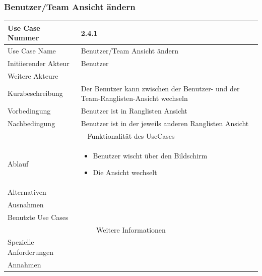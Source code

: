 \documentclass[10pt,a4paper]{article}
\begin{document}
\subsubsection{Benutzer/Team Ansicht \"andern}
		\begin{tabular}{|l|p{.5\linewidth}|}
		\hline Use Case Nummer & 2.4.1 \\ 
		\hline Use Case Name & Benutzer/Team Ansicht \"andern \\ 
		\hline Initiierender Akteur & Benutzer \\
		\hline Weitere Akteure &  \\
		\hline Kurzbeschreibung & Der Benutzer kann zwischen der Benutzer- und der Team-Ranglisten-Ansicht wechseln \\
		\hline Vorbedingung & Benutzer ist in Ranglisten Ansicht \\
		\hline Nachbedingung & Benutzer ist in der jeweils anderen Ranglisten Ansicht \\
		\hline \multicolumn{2}{|c|}{Funktionalität des UseCases}\\
		\hline Ablauf & \begin{itemize}
			\item Benutzer wischt \"uber den Bildschirm
			\item Die Ansicht wechselt
		\end{itemize} \\
		\hline Alternativen &  \\
		\hline Ausnahmen &  \\
		\hline Benutzte Use Cases &  \\
		\hline \multicolumn{2}{|c|}{Weitere Informationen} \\
		\hline Spezielle Anforderungen &  \\
		\hline Annahmen &  \\
		\hline
		\end{tabular}
		
\end{document}
